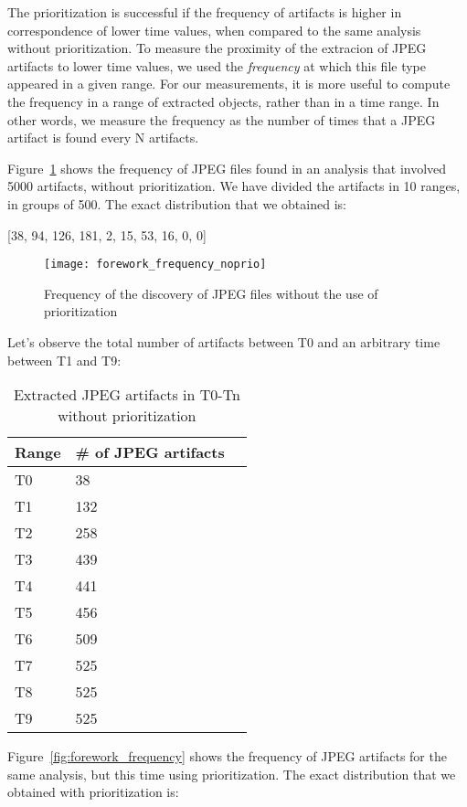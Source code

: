 \documentclass[twoside]{article}
\begin{document}
\begin{multicols}{2}
The prioritization is successful if the frequency of artifacts is higher in
correspondence of lower time values, when compared to the same analysis without
prioritization. To measure the
proximity of the extracion of JPEG artifacts to lower time values, we used the
\emph{frequency} at which this file type appeared in a given range. For our
measurements, it is more useful to compute the frequency in a range of extracted
objects, rather than in a time range. In other words, we measure the frequency as
the number of times that a JPEG artifact is found every N artifacts.

Figure~\ref{fig:forework_frequency_noprio} shows the frequency of JPEG files
found in an analysis that involved 5000 artifacts, without prioritization.
We have divided the artifacts in 10 ranges, in groups of 500. The exact
distribution that we obtained is:

[38, 94, 126, 181, 2, 15, 53, 16, 0, 0]

\begin{figure}[H]
    \centering
    \texttt{[image: forework\_frequency\_noprio]}
    \caption{Frequency of the discovery of JPEG files without the use of prioritization}
    \label{fig:forework_frequency_noprio}
\end{figure}

Let's observe the total number of artifacts between T0 and an arbitrary time
between T1 and T9:

\begin{table}[H]
\caption{Extracted JPEG artifacts in T0-Tn without prioritization}
\centering
\begin{tabular}{llr}
\toprule
Range & \# of JPEG artifacts \\
\midrule
T0 & 38 \\
T1 & 132 \\
T2 & 258 \\
T3 & 439 \\
T4 & 441 \\
T5 & 456 \\
T6 & 509 \\
T7 & 525 \\
T8 & 525 \\
T9 & 525 \\
\bottomrule
\end{tabular}
\end{table}

Figure~\ref{fig:forework_frequency} shows the frequency of JPEG artifacts for the
same analysis, but this time using prioritization. The exact distribution that
we obtained with prioritization is:


\end{multicols}
\end{document}
